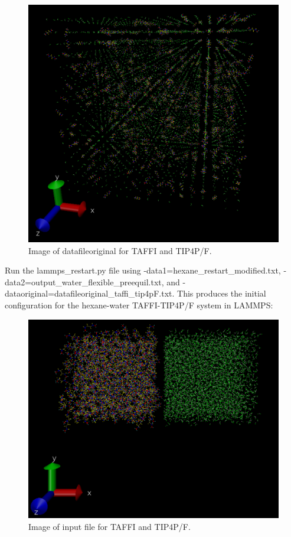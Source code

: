 \documentclass[12pt,reqno]{amsart}
\numberwithin{equation}{section}
\begin{document}
\begin{enumerate}
\begin{figure}[H]
\centering
\includegraphics[scale=0.4]{datafileoriginal_taffi_tip4pF}
\caption{Image of datafileoriginal for TAFFI and TIP4P/F.}
\end{figure}

Run the lammps\_restart.py file using -data1=hexane\_restart\_modified.txt, -data2=output\_water\_flexible\_preequil.txt, and -dataoriginal=datafileoriginal\_taffi\_tip4pF.txt.  This produces the initial configuration for the hexane-water TAFFI-TIP4P/F system in LAMMPS:

\begin{figure}[H]
\centering
\includegraphics[scale=0.4]{input_restart_taffi_tip4pF}
\caption{Image of input file for TAFFI and TIP4P/F.}
\end{figure}


\end{enumerate}
\end{document}
